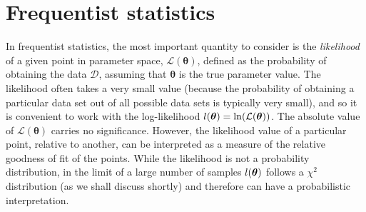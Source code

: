 


\section{Frequentist statistics}


In frequentist statistics, the most important quantity to consider is the \textit{likelihood} of a given point in parameter space, $\mathcal{L}(\boldsymbol\theta)$, defined as the probability of obtaining the data $\mathcal{D}$, assuming that $\boldsymbol\theta$ is the true parameter value. The likelihood often takes a very small value (because the probability of obtaining a particular data set out of all possible data sets is typically very small), and so it is convenient to work with the log-likelihood $l(\boldsymbol\theta) = \ln(\mathcal{L}(\boldsymbol\theta))$. The absolute value of $\mathcal{L}(\boldsymbol\theta)$ carries no significance. However, the likelihood value of a particular point, relative to another, can be interpreted as a measure of the relative goodness of fit of the points. While the likelihood is not a probability distribution, in the limit of a large number of samples $l(\boldsymbol\theta)$ follows a $\chi^2$ distribution (as we shall discuss shortly) and therefore can have a probabilistic interpretation.

